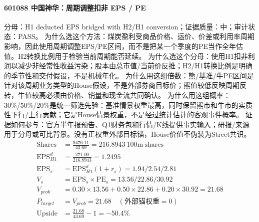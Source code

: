 \paragraph{601088 中国神华：周期调整扣非 EPS / PE}
分母：H1 deducted EPS bridged with H2/H1 conversion；证据质量：中；审计状态：PASS。
为什么选这个方法：煤炭盈利受商品价格、运价、价差或利用率周期影响，因此使用周期调整EPS/PE区间，而不是把某一个季度的PE当作全年估值。H2转换比例用于检验当前周期能否延续。
为什么选这个分母：使用H1扣非利润以减少非经常性收益污染；股本由总市值/当前价反推；H2/H1转换比例是明确的季节性和交付假设，不是机械年化。
为什么用这组倍数：熊/基准/牛PE区间是针对该周期业务类型的House假设，不是外部券商目标价；熊值较低反映周期反转，牛值较高必须由价格、销量和现金流共同确认。
为什么用这组概率：30\%/50\%/20\%是统一筛选先验：基准情景权重最高，同时保留熊市和牛市的实质性下行/上行贡献；它是House情景权重，不是经过统计估计的客观事件概率。
证据如何参与：官方半年报预告、Q1财务包和行情/K线提供事实输入；研报/来源用于分母或可比背景。没有正权重外部目标锚，House价值不伪装为Street共识。
\begin{align*}
\mathrm{Shares} &= \frac{9476.11}{43.69}=216.8943\ \mathrm{100m\ shares}\\
\mathrm{EPS}_{H1}^d &= \frac{271.00}{216.8943}=1.2495\\
\mathrm{EPS}_s &= \mathrm{EPS}_{H1}^d(1+r_s)=1.94/2.54/2.81\\
V_s &= \mathrm{EPS}_s\times \mathrm{PE}_s=13.56/22.86/30.92\\
V_{prob} &= 0.30\times 13.56+0.50\times 22.86+0.20\times 30.92=21.68\\
P_{target} &= V_{prob}=21.68\quad(\text{外部锚权重}=0)\\
\mathrm{Upside} &= \frac{21.68}{43.69}-1=-50.4\%\\
\end{align*}

